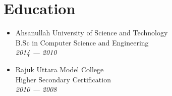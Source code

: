 \section{Education}

\begin{itemize}
  \item
  Ahsanullah University of Science and Technology\\
  B.Sc in Computer Science and Engineering\\
  \textit{2014 — 2010}

  \item
  Rajuk Uttara Model College\\
  Higher Secondary Certification\\
  \textit{2010 — 2008}
\end{itemize}
